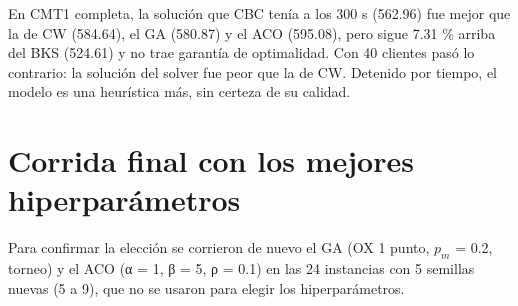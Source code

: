 \documentclass[11pt,letterpaper]{article}
\begin{document}
En CMT1 completa, la solución que CBC tenía a los 300 s (562.96) fue mejor que la de CW (584.64), el GA (580.87) y el ACO (595.08), pero sigue 7.31 \% arriba del BKS (524.61) y no trae garantía de optimalidad. Con 40 clientes pasó lo contrario: la solución del solver fue peor que la de CW. Detenido por tiempo, el modelo es una heurística más, sin certeza de su calidad.

\hypertarget{corrida-final-con-los-mejores-hiperparuxe1metros}{%
\section{Corrida final con los mejores hiperparámetros}\label{corrida-final-con-los-mejores-hiperparuxe1metros}}

Para confirmar la elección se corrieron de nuevo el GA (OX 1 punto, \(p_{m}\) = 0.2, torneo) y el ACO (α = 1, β = 5, ρ = 0.1) en las 24 instancias con 5 semillas nuevas (5 a 9), que no se usaron para elegir los hiperparámetros.
\end{document}
